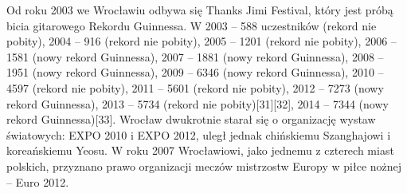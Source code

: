 \documentclass{article}
\begin{document}
\bigskip
\newline
Od roku 2003 we Wrocławiu odbywa się Thanks Jimi Festival, który jest próbą bicia gitarowego Rekordu Guinnessa. W 2003 – 588 uczestników (rekord nie pobity), 2004 – 916 (rekord nie pobity), 2005 – 1201 (rekord nie pobity), 2006 – 1581 (nowy rekord Guinnessa), 2007 – 1881 (nowy rekord Guinnessa), 2008 – 1951 (nowy rekord Guinnessa), 2009 – 6346 (nowy rekord Guinnessa), 2010 – 4597 (rekord nie pobity), 2011 – 5601 (rekord nie pobity), 2012 – 7273 (nowy rekord Guinnessa), 2013 – 5734 (rekord nie pobity)[31][32], 2014 – 7344 (nowy rekord Guinnessa)[33].
\bigskip
\newline
Wrocław dwukrotnie starał się o organizację wystaw światowych: EXPO 2010 i EXPO 2012, uległ jednak chińskiemu Szanghajowi i koreańskiemu Yeosu. W roku 2007 Wrocławiowi, jako jednemu z czterech miast polskich, przyznano prawo organizacji meczów mistrzostw Europy w piłce nożnej – Euro 2012.
\end{document}
